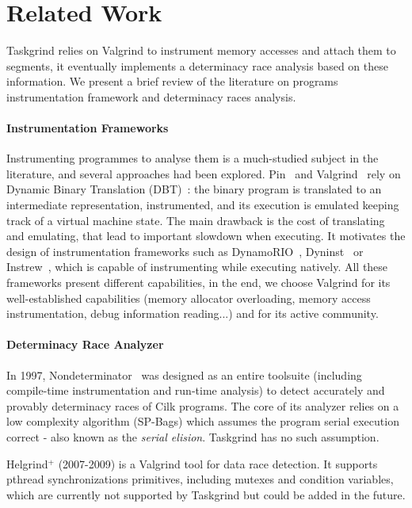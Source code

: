 
\section{Related Work} \label{sec:relworks}
Taskgrind relies on Valgrind to instrument memory accesses and attach them to segments, it eventually implements a determinacy race analysis based on these information.
We present a brief review of the literature on programs instrumentation framework and determinacy races analysis.

\paragraph{Instrumentation Frameworks}
Instrumenting programmes to analyse them is a much-studied subject in the literature, and several approaches had been explored.
Pin~\cite{pin} and Valgrind~\cite{valgrind} rely on Dynamic Binary Translation (DBT)~\cite{dbt}: the binary program is translated to an intermediate representation, instrumented, and its execution is emulated keeping track of a virtual machine state.
The main drawback is the cost of translating and emulating, that lead to important slowdown when executing.
It motivates the design of instrumentation frameworks such as DynamoRIO~\cite{dynamorio}, Dyninst~\cite{dyninstr} or Instrew~\cite{llvm-dbi}, which is capable of instrumenting while executing natively.
All these frameworks present different capabilities, in the end, we choose Valgrind for its well-established capabilities (memory allocator overloading, memory access instrumentation, debug information reading...) and for its active community.

\paragraph{Determinacy Race Analyzer}
In 1997, Nondeterminator~\cite{nondeterminator} was designed as an entire toolsuite (including compile-time instrumentation and run-time analysis) to detect accurately and provably determinacy races of Cilk programs.
The core of its analyzer relies on a low complexity algorithm (SP-Bags) which assumes the program serial execution correct - also known as the \emph{serial elision}.
Taskgrind has no such assumption.

Helgrind$^{+}$ (2007-2009) is a Valgrind tool for data race detection.
It supports pthread synchronizations primitives, including mutexes and condition variables, which are currently not supported by Taskgrind but could be added in the future.

